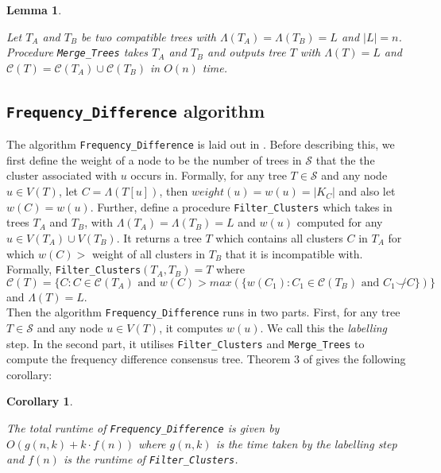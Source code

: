 \documentclass{article}
\newcommand{\compatible}{\smile}
\newcommand{\leafset}{\Lambda}
\newtheorem{mergetrees}[incompatibility]{Lemma}
\newtheorem{freqdiffruntime}[incompatibility]{Corollary}
\begin{document}
    \begin{mergetrees}
        \label{lem:mergetrees}

        Let $T_A$ and $T_B$ be two compatible trees with $\leafset(T_A) = \leafset(T_B) = L$ and $|L| = n$. Procedure \texttt{Merge\_Trees} takes $T_A$ and $T_B$ and outputs tree $T$ with $\leafset(T) = L$ and $\mathcal{C}(T) = \mathcal{C}(T_A) \cup \mathcal{C}(T_B)$ in $O(n)$ time.
    \end{mergetrees}

    \subsection{\texttt{Frequency\_Difference} algorithm}
    The algorithm \texttt{Frequency\_Difference} is laid out in \cite{jansson2018algorithms}. Before describing this, we first define the weight of a node to be the number of trees in $\mathcal{S}$ that the the cluster associated with $u$ occurs in. Formally, for any tree $T \in \mathcal{S}$ and any node $u \in V(T)$, let $C = \leafset(T[u])$, then $weight(u) = w(u) = |K_C|$ and also let $w(C) = w(u)$. Further, define a procedure \texttt{Filter\_Clusters} which takes in trees $T_A$ and $T_B$, with $\leafset(T_A) = \leafset(T_B) = L$ and $w(u)$ computed for any $u \in V(T_A) \cup V(T_B)$. It returns a tree $T$ which contains all clusters $C$ in $T_A$ for which $w(C) > $ weight of all clusters in $T_B$ that it is incompatible with. Formally, \texttt{Filter\_Clusters}$(T_A, T_B) = T$ where $\mathcal{C}(T) = \{C : C \in \mathcal{C}(T_A) \text{ and } w(C) > max(\{w(C_1) : C_1 \in \mathcal{C}(T_B) \text{ and } C_1 \not\compatible C\})\}$ and $\leafset(T) = L$.\\

    Then the algorithm \texttt{Frequency\_Difference} runs in two parts. First, for any tree $T \in \mathcal{S}$ and any node $u \in V(T)$, it computes $w(u)$. We call this the \textit{labelling} step. In the second part, it utilises \texttt{Filter\_Clusters} and \texttt{Merge\_Trees} to compute the frequency difference consensus tree. Theorem 3 of \cite{jansson2018algorithms} gives the following corollary:

    \begin{freqdiffruntime}
        \label{cor:freqdiffruntime}

        The total runtime of \texttt{Frequency\_Difference} is given by $O(g(n, k) + k \cdot f(n))$ where $g(n, k)$ is the time taken by the labelling step and $f(n)$ is the runtime of \texttt{Filter\_Clusters}.
    \end{freqdiffruntime}
\end{document}
